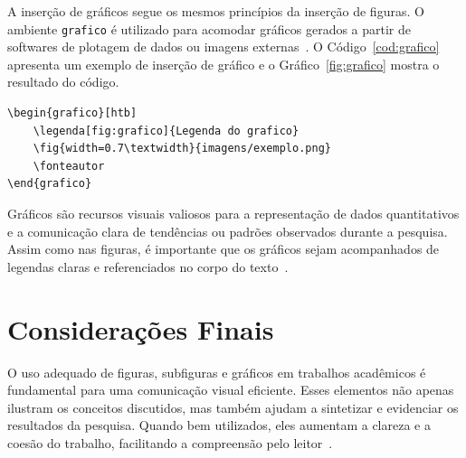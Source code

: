 A inserção de gráficos segue os mesmos princípios da inserção de figuras. O ambiente \texttt{grafico} é utilizado para acomodar gráficos gerados a partir de softwares de plotagem de dados ou imagens externas~\cite{mittelbach2004latex}. O Código~\ref{cod:grafico} apresenta um exemplo de inserção de gráfico e o Gráfico~\ref{fig:grafico} mostra o resultado do código.

\begin{codigo}[htb]
\begin{lstlisting}
\begin{grafico}[htb]
    \legenda[fig:grafico]{Legenda do grafico}
    \fig{width=0.7\textwidth}{imagens/exemplo.png}
    \fonteautor
\end{grafico}
\end{lstlisting}
\fonteautor
\end{codigo}

\begin{grafico}[htb]
\end{grafico}

Gráficos são recursos visuais valiosos para a representação de dados quantitativos e a comunicação clara de tendências ou padrões observados durante a pesquisa. Assim como nas figuras, é importante que os gráficos sejam acompanhados de legendas claras e referenciados no corpo do texto~\cite{tufte1990envisioning}.

\section{Considerações Finais}

O uso adequado de figuras, subfiguras e gráficos em trabalhos acadêmicos é fundamental para uma comunicação visual eficiente. Esses elementos não apenas ilustram os conceitos discutidos, mas também ajudam a sintetizar e evidenciar os resultados da pesquisa. Quando bem utilizados, eles aumentam a clareza e a coesão do trabalho, facilitando a compreensão pelo leitor~\cite{tufte1990envisioning, knuth1984texbook}.
